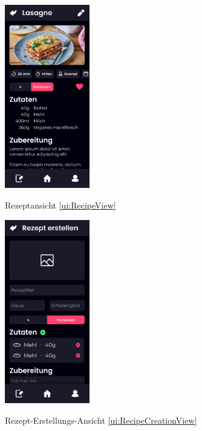 \documentclass[parskip=full]{scrartcl}
\begin{document}
\begin{figure}[htp]
    \begin{minipage}
        [t]{0.49\textwidth}
        \centering
        \includegraphics[height=80mm]{images/ui/RecipeView.jpg}
        \label{fig:RecipeView}
        \caption{Rezeptansicht \ref{ui:RecipeView}}
    \end{minipage}
    \begin{minipage}
        [t]{0.49\textwidth}
        \centering
        \includegraphics[height=80mm]{images/ui/RecipeCreationView.jpg}
        \label{fig:RecipeCreationView}
        \caption{Rezept-Erstellungs-Ansicht \ref{ui:RecipeCreationView}}
    \end{minipage}
\end{figure}
\end{document}
